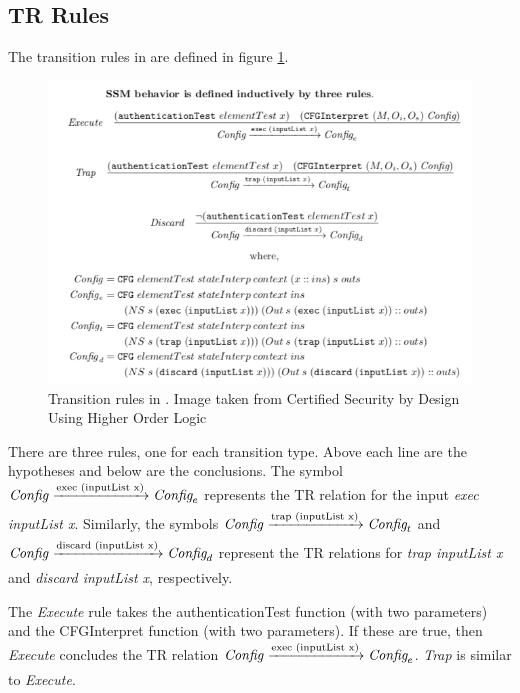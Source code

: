 \documentclass[../../main/main.tex]{subfiles}
\begin{document}
\subsection{TR Rules}\label{ssec:trrules}
The transition rules in  are defined in figure \ref{trrules}.

\begin{figure}[h!]
\centering
\includegraphics[width=\textwidth]{../figures/trrules}
\caption{\label{trrules} Transition rules in .   Image taken from Certified Security by Design Using Higher Order Logic \cite{certmanual}}
\end{figure}

There are three rules, one for each transition type.  Above each line are the hypotheses and below are the conclusions.  The symbol $\text{\textit{Config}}  \xrightarrow[\text{}]{\text{exec (inputList x)}} \textit{Config}_e$ represents the TR relation for the input \textit{exec inputList x}.  Similarly, the symbols $\text{\textit{Config}}  \xrightarrow[\text{}]{\text{trap (inputList x)}} \textit{Config}_t$ and $\text{\textit{Config}}  \xrightarrow[\text{}]{\text{discard (inputList x)}} \textit{Config}_d$ represent the TR relations for \textit{trap inputList x} and \textit{discard inputList x}, respectively. 


The \textit{Execute} rule takes the authenticationTest function (with two parameters) and the CFGInterpret function (with two parameters).  If these are true, then \textit{Execute} concludes the TR relation $\text{\textit{Config}}  \xrightarrow[\text{}]{\text{exec (inputList x)}} \textit{Config}_e$.  \textit{Trap} is similar to \textit{Execute}.
\end{document}
